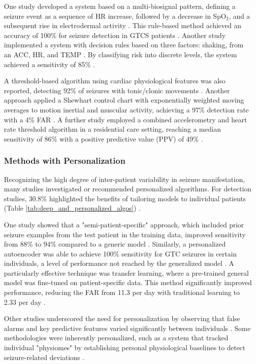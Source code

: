 One study developed a system based on a multi-biosignal pattern, defining a seizure event as a sequence of HR increase, followed by a decrease in SpO$_2$, and a subsequent rise in electrodermal activity \cite{Cogan2017-lg}. This rule-based method achieved an accuracy of 100\% for seizure detection in GTCS patients \cite{Cogan2017-lg}. Another study implemented a system with decision rules based on three factors: shaking, from an ACC, HR, and TEMP \cite{Ali2020-ke}. By classifying risk into discrete levels, the system achieved a sensitivity of 85\% \cite{Ali2020-ke}. 

A threshold-based algorithm using cardiac physiological features was also reported, detecting 92\% of seizures with tonic/clonic movements \cite{Hegarty-Craver2021-hk}. Another approach applied a Shewhart control chart with exponentially weighted moving averages to motion inertial and muscular activity, achieving a 97\% detection rate with a 4\% FAR \cite{Gheryani2017-yg}. A further study employed a combined accelerometry and heart rate threshold algorithm in a residential care setting, reaching a median sensitivity of 86\% with a positive predictive value (PPV) of 49\% \cite{Arends2018-ew}.


\subsubsection{Methods with Personalization}
Recognizing the high degree of inter-patient variability in seizure manifestation, many studies investigated or recommended personalized algorithms. For detection studies, 30.8\% highlighted the benefits of tailoring models to individual patients (Table \ref{tab:deep_and_personalized_algos}) \cite{Yu2023-ss, Poh2012-af, Nasseri2021-xn, Milosevic2016-ee, Hamlin2021-sd, Jiang2022-zu, Hegarty-Craver2021-hk, Wang2025-ql}.

One study showed that a "semi-patient-specific" approach, which included prior seizure examples from the test patient in the training data, improved sensitivity from 88\% to 94\% compared to a generic model \cite{Poh2012-af}. Similarly, a personalized autoencoder was able to achieve 100\% sensitivity for GTC seizures in certain individuals, a level of performance not reached by the generalized model \cite{Yu2023-ss}. A particularly effective technique was transfer learning, where a pre-trained general model was fine-tuned on patient-specific data. This method significantly improved performance, reducing the FAR from 11.3 per day with traditional learning to 2.33 per day \cite{Nasseri2021-xn}.

Other studies underscored the need for personalization by observing that false alarms and key predictive features varied significantly between individuals \cite{Milosevic2016-ee, Hamlin2021-sd}. Some methodologies were inherently personalized, such as a system that tracked individual "physiomes" by establishing personal physiological baselines to detect seizure-related deviations \cite{Jiang2022-zu}.


